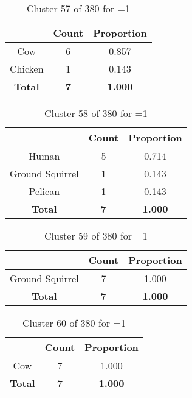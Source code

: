 \begin{table}[ht!]
\centering
\begin{tabular}{|c|c|c|}
\hline
\bf \Spec{} &\bf Count &\bf Proportion\\ \hline \hline
Cow & 6 & 0.857\\ \hline
Chicken & 1 & 0.143\\ \hline
\hline
\bf Total & \bf 7 & \bf 1.000\\ \hline
\end{tabular}
\label{tab:cluster:57:1}
\caption{Cluster 57 of 380 for \minneigh{}=1}
\end{table}

\begin{table}[ht!]
\centering
\begin{tabular}{|c|c|c|}
\hline
\bf \Spec{} &\bf Count &\bf Proportion\\ \hline \hline
Human & 5 & 0.714\\ \hline
Ground Squirrel & 1 & 0.143\\ \hline
Pelican & 1 & 0.143\\ \hline
\hline
\bf Total & \bf 7 & \bf 1.000\\ \hline
\end{tabular}
\label{tab:cluster:58:1}
\caption{Cluster 58 of 380 for \minneigh{}=1}
\end{table}

\begin{table}[ht!]
\centering
\begin{tabular}{|c|c|c|}
\hline
\bf \Spec{} &\bf Count &\bf Proportion\\ \hline \hline
Ground Squirrel & 7 & 1.000\\ \hline
\hline
\bf Total & \bf 7 & \bf 1.000\\ \hline
\end{tabular}
\label{tab:cluster:59:1}
\caption{Cluster 59 of 380 for \minneigh{}=1}
\end{table}

\clearpage
\begin{table}[ht!]
\centering
\begin{tabular}{|c|c|c|}
\hline
\bf \Spec{} &\bf Count &\bf Proportion\\ \hline \hline
Cow & 7 & 1.000\\ \hline
\hline
\bf Total & \bf 7 & \bf 1.000\\ \hline
\end{tabular}
\label{tab:cluster:60:1}
\caption{Cluster 60 of 380 for \minneigh{}=1}
\end{table}


